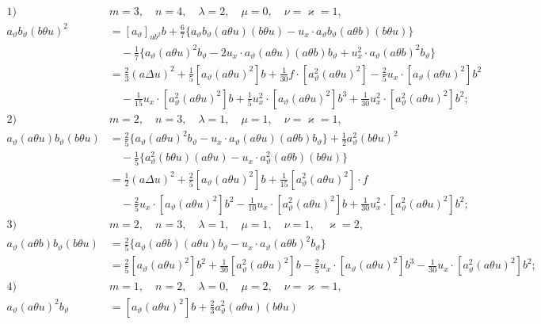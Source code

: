 \documentclass[11pt]{article}
\begin{document}
\begin{align*}
\text{1)}\quad&m=3,\quad n=4,\quad \lambda=2,\quad \mu=0,\quad \nu=\varkappa=1,\\
a_\vartheta b_\vartheta(b\theta u)^2
&=[a_\vartheta]_{u b^2}b+\frac67\{a_\vartheta b_\vartheta(a\theta u)(b\theta u)-u_x\cdot a_\vartheta b_\vartheta(a\theta b)(b\theta u)\}\\
&\quad-\frac17\{a_\vartheta(a\theta u)^2b_\vartheta-2u_x\cdot a_\vartheta(a\theta u)(a\theta b)b_\vartheta+u_x^2\cdot a_\vartheta(a\theta b)^2b_\vartheta\}\\
&=\frac23(a\Delta u)^2+\frac15[a_\vartheta(a\theta u)^2]b+\frac1{30}f\cdot[a_\vartheta^2(a\theta u)^2]-\frac25u_x\cdot[a_\vartheta(a\theta u)^2]b^2\\
&\quad-\frac1{15}u_x\cdot[a_\vartheta^2(a\theta u)^2]b+\frac15u_x^2\cdot[a_\vartheta(a\theta u)^2]b^3+\frac1{30}u_x^2\cdot[a_\vartheta^2(a\theta u)^2]b^2;\\[.6em]
\text{2)}\quad&m=2,\quad n=3,\quad \lambda=1,\quad \mu=1,\quad \nu=\varkappa=1,\\
a_\vartheta(a\theta u)b_\vartheta(b\theta u)
&=\frac25\{a_\vartheta(a\theta u)^2b_\vartheta-u_x\cdot a_\vartheta(a\theta u)(a\theta b)b_\vartheta\}+\frac12a_\vartheta^2(b\theta u)^2\\
&\quad-\frac15\{a_\vartheta^2(b\theta u)(a\theta u)-u_x\cdot a_\vartheta^2(a\theta b)(b\theta u)\}\\
&=\frac12(a\Delta u)^2+\frac25[a_\vartheta(a\theta u)^2]b+\frac1{15}[a_\vartheta^2(a\theta u)^2]\cdot f\\
&\quad-\frac25u_x\cdot[a_\vartheta(a\theta u)^2]b^2-\frac1{10}u_x\cdot[a_\vartheta^2(a\theta u)^2]b+\frac1{30}u_x^2\cdot[a_\vartheta^2(a\theta u)^2]b^2;\\[.6em]
\text{3)}\quad&m=2,\quad n=3,\quad \lambda=1,\quad \mu=1,\quad \nu=1,\quad \varkappa=2,\\
a_\vartheta(a\theta b)b_\vartheta(b\theta u)
&=\frac25\{a_\vartheta(a\theta b)(a\theta u)b_\vartheta-u_x\cdot a_\vartheta(a\theta b)^2b_\vartheta\}\\
&=\frac25[a_\vartheta(a\theta u)^2]b^2+\frac1{30}[a_\vartheta^2(a\theta u)^2]b-\frac25u_x\cdot[a_\vartheta(a\theta u)^2]b^3-\frac1{30}u_x\cdot[a_\vartheta^2(a\theta u)^2]b^2;\\[.6em]
\text{4)}\quad&m=1,\quad n=2,\quad \lambda=0,\quad \mu=2,\quad \nu=\varkappa=1,\\
a_\vartheta(a\theta u)^2b_\vartheta
&=[a_\vartheta(a\theta u)^2]b+\frac23a_\vartheta^2(a\theta u)(b\theta u)\\

\end{align*}
\end{document}
